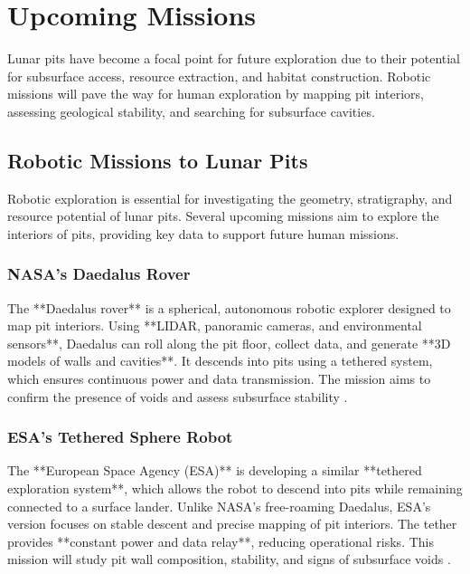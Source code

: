 \graphicspath{{img/ch5}}

\section{Upcoming Missions}

Lunar pits have become a focal point for future exploration due to their potential for subsurface access, resource extraction, and habitat construction. Robotic missions will pave the way for human exploration by mapping pit interiors, assessing geological stability, and searching for subsurface cavities.

\subsection{Robotic Missions to Lunar Pits}

Robotic exploration is essential for investigating the geometry, stratigraphy, and resource potential of lunar pits. Several upcoming missions aim to explore the interiors of pits, providing key data to support future human missions.

\subsubsection{NASA's Daedalus Rover}

The **Daedalus rover** is a spherical, autonomous robotic explorer designed to map pit interiors. Using **LIDAR, panoramic cameras, and environmental sensors**, Daedalus can roll along the pit floor, collect data, and generate **3D models of walls and cavities**. It descends into pits using a tethered system, which ensures continuous power and data transmission. The mission aims to confirm the presence of voids and assess subsurface stability \cite{thermal-lunar-pits, newer-thermal}.

\subsubsection{ESA's Tethered Sphere Robot}

The **European Space Agency (ESA)** is developing a similar **tethered exploration system**, which allows the robot to descend into pits while remaining connected to a surface lander. Unlike NASA's free-roaming Daedalus, ESA's version focuses on stable descent and precise mapping of pit interiors. The tether provides **constant power and data relay**, reducing operational risks. This mission will study pit wall composition, stability, and signs of subsurface voids \cite{thermal-lunar-pits}.

